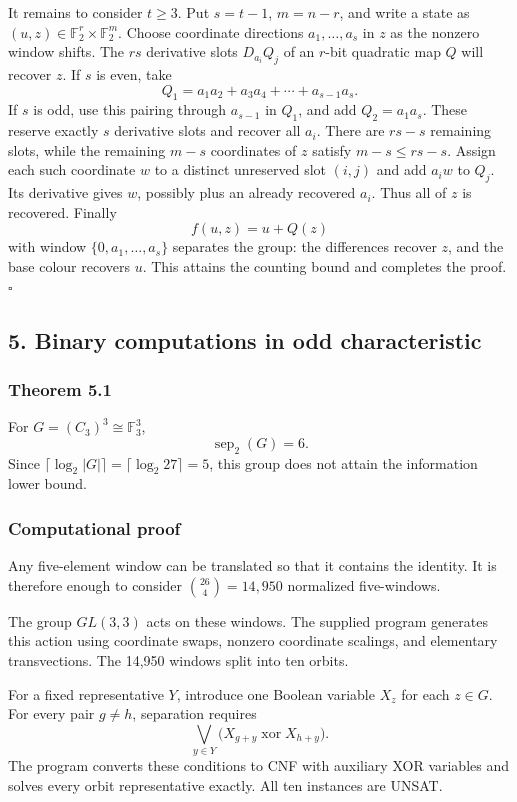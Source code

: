 \documentclass[
]{article}
\begin{document}
It remains to consider \(t\ge3\). Put \(s=t-1\), \(m=n-r\), and write a
state as \((u,z)\in\mathbb F_2^r\times\mathbb F_2^m\). Choose coordinate
directions \(a_1,\ldots,a_s\) in \(z\) as the nonzero window shifts. The
\(rs\) derivative slots \(D_{a_i}Q_j\) of an \(r\)-bit quadratic map \(Q\)
will recover \(z\). If \(s\) is even, take
\[
Q_1=a_1a_2+a_3a_4+\cdots+a_{s-1}a_s.
\]
If \(s\) is odd, use this pairing through \(a_{s-1}\) in \(Q_1\), and add
\(Q_2=a_1a_s\). These reserve exactly \(s\) derivative slots and recover all
\(a_i\). There are \(rs-s\) remaining slots, while the remaining \(m-s\)
coordinates of \(z\) satisfy \(m-s\le rs-s\). Assign each such coordinate
\(w\) to a distinct unreserved slot \((i,j)\) and add \(a_iw\) to \(Q_j\).
Its derivative gives \(w\), possibly plus an already recovered \(a_i\). Thus
all of \(z\) is recovered. Finally
\[
f(u,z)=u+Q(z)
\]
with window \(\{0,a_1,\ldots,a_s\}\) separates the group: the differences
recover \(z\), and the base colour recovers \(u\). This attains the counting
bound and completes the proof. \(\square\)

\subsection{5. Binary computations in odd characteristic}
\subsubsection{Theorem 5.1}
For \(G=(C_3)^3\cong\mathbb F_3^3\),
\[
\boxed{\operatorname{sep}_2(G)=6.}
\]
Since \(\lceil\log_2|G|\rceil=\lceil\log_2 27\rceil=5\), this group does not attain the information lower bound.

\subsubsection{Computational proof}
Any five-element window can be translated so that it contains the identity. It is therefore enough to consider \(\binom{26}{4}=14,950\) normalized five-windows.

The group \(GL(3,3)\) acts on these windows. The supplied program generates this action using coordinate swaps, nonzero coordinate scalings, and elementary transvections. The 14,950 windows split into ten orbits.

For a fixed representative \(Y\), introduce one Boolean variable \(X_z\) for each \(z\in G\). For every pair \(g\ne h\), separation requires
\[
\bigvee_{y\in Y}\bigl(X_{g+y}\operatorname{xor}X_{h+y}\bigr).
\]
The program converts these conditions to CNF with auxiliary XOR variables and solves every orbit representative exactly. All ten instances are UNSAT.
\end{document}
